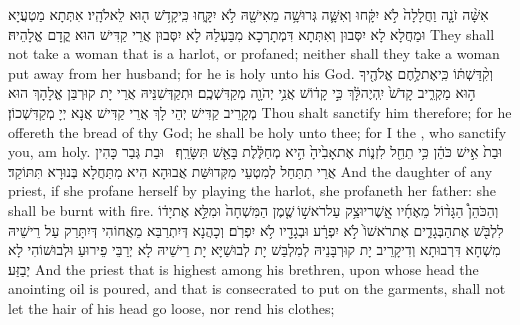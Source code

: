 {אִשָּׁ֨ה זֹנָ֤ה וַחֲלָלָה֙ לֹ֣א יִקָּ֔חוּ וְאִשָּׁ֛ה גְּרוּשָׁ֥ה מֵאִישָׁ֖הּ לֹ֣א יִקָּ֑חוּ כִּֽי\maqqaf קָדֹ֥שׁ ה֖וּא לֵאלֹהָֽיו׃}
{אִתְּתָא מַטְעֲיָא וּמַחֲלָא לָא יִסְּבוּן וְאִתְּתָא דִּמְתָרְכָא מִבַּעְלַהּ לָא יִסְּבוּן אֲרֵי קַדִּישׁ הוּא קֳדָם אֱלָהֵיהּ׃}
{They shall not take a woman that is a harlot, or profaned; neither shall they take a woman put away from her husband; for he is holy unto his God.}{}
{וְקִ֨דַּשְׁתּ֔וֹ כִּֽי\maqqaf אֶת\maqqaf לֶ֥חֶם אֱלֹהֶ֖יךָ ה֣וּא מַקְרִ֑יב קָדֹשׁ֙ יִֽהְיֶה\maqqaf לָּ֔ךְ כִּ֣י קָד֔וֹשׁ אֲנִ֥י יְהֹוָ֖ה מְקַדִּשְׁכֶֽם׃}
{וּתְקַדְּשִׁנֵּיהּ אֲרֵי יָת קוּרְבַּן אֱלָהָךְ הוּא מְקָרֵיב קַדִּישׁ יְהֵי לָךְ אֲרֵי קַדִּישׁ אֲנָא יְיָ מְקַדִּשְׁכוֹן׃}
{Thou shalt sanctify him therefore; for he offereth the bread of thy God; he shall be holy unto thee; for I the \lord, who sanctify you, am holy.}{}
{וּבַת֙ אִ֣ישׁ כֹּהֵ֔ן כִּ֥י תֵחֵ֖ל לִזְנ֑וֹת אֶת\maqqaf אָבִ֙יהָ֙ הִ֣יא מְחַלֶּ֔לֶת בָּאֵ֖שׁ תִּשָּׂרֵֽף׃ \setuma }
{וּבַת גְּבַר כָּהִין אֲרֵי תִתַּחַל לְמִטְעֵי מִקְּדוּשַּׁת אֲבוּהָא הִיא מִתַּחֲלָא בְּנוּרָא תִּתּוֹקַד׃}
{And the daughter of any priest, if she profane herself by playing the harlot, she profaneth her father: she shall be burnt with fire.}{}
{וְהַכֹּהֵן֩ הַגָּד֨וֹל מֵאֶחָ֜יו אֲֽשֶׁר\maqqaf יוּצַ֥ק עַל\maqqaf רֹאשׁ֣וֹ \legarmeh  שֶׁ֤מֶן הַמִּשְׁחָה֙ וּמִלֵּ֣א אֶת\maqqaf יָד֔וֹ לִלְבֹּ֖שׁ אֶת\maqqaf הַבְּגָדִ֑ים אֶת\maqqaf רֹאשׁוֹ֙ לֹ֣א יִפְרָ֔ע וּבְגָדָ֖יו לֹ֥א יִפְרֹֽם׃}
{וְכָהֲנָא דְּיִתְרַבַּא מֵאֲחוֹהִי דְּיִתָּרַק עַל רֵישֵׁיהּ מִשְׁחָא דִּרְבוּתָא וְדִיקָרֵיב יָת קוּרְבָּנֵיהּ לְמִלְבַּשׁ יָת לְבוּשַׁיָּא יָת רֵישֵׁיהּ לָא יְרַבֵּי פֵירוּעַ וּלְבוּשׁוֹהִי לָא יְבַזַּע׃}
{And the priest that is highest among his brethren, upon whose head the anointing oil is poured, and that is consecrated to put on the garments, shall not let the hair of his head go loose, nor rend his clothes;}{}
